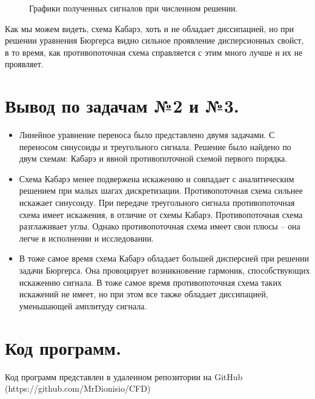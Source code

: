 \begin{figure}[H]
    \centering
    \hfill
    \hfill
    \caption{Графики полученных сигналов при численном решении.}
    \label{fig:31}
\end{figure}

Как мы можем видеть, схема Кабарэ, хоть и не обладает диссипацией, но при решении уравнения Бюргерса видно сильное проявление дисперсионных свойст, в то время, как противопоточная схема справляется с этим много лучше и их не проявляет.

\section{Вывод по задачам №2 и №3.}
\begin{itemize}
    \item Линейное уравнение переноса было представлено двумя задачами. С переносом синусоиды и треугольного сигнала. Решение было найдено по двум схемам: Кабарэ и явной противопоточной схемой первого порядка. 
    \item Схема Кабарэ менее подвержена искажению и совпадает с аналитическим решением при малых шагах дискретизации. Противопоточная схема сильнее искажает синусоиду.  При передаче треугольного сигнала противопоточная схема имеет искажения, в отличие от схемы Кабарэ. Противопоточная схема разглаживает углы. Однако противопоточная схема имеет свои плюсы – она легче в исполнении и исследовании.  
    \item В тоже самое время схема Кабарэ обладает большей дисперсией при решении задачи Бюргерса. Она провоцирует возникновение гармоник, способствующих искажению сигнала. В тоже самое время противопоточная схема таких искажений не имеет, но при этом все также обладает диссипацией, уменьшающей амплитуду сигнала. 
\end{itemize}
\section{Код программ.}
Код программ представлен в удаленном репозитории на GitHub \\ (https://github.com/MrDionisio/CFD)
